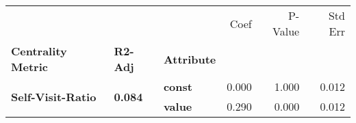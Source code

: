 \begin{tabular}{lllrrr}
\toprule
                 &       &       &  Coef &  P-Value &  Std Err \\
\textbf{Centrality Metric} & \textbf{R2-Adj} & \textbf{Attribute} &       &          &          \\
\midrule
\multirow{2}{*}{\textbf{Self-Visit-Ratio}} & \multirow{2}{*}{\textbf{0.084}} & \textbf{const} & 0.000 &    1.000 &    0.012 \\
                 &       & \textbf{value} & 0.290 &    0.000 &    0.012 \\
\bottomrule
\end{tabular}
